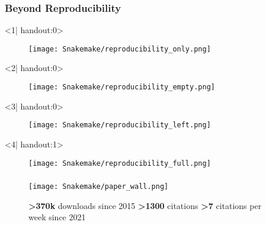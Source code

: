 \begin{frame}
  \frametitle{Beyond Reproducibility}
  \begin{onlyenv}<1| handout:0>
    \begin{figure}
      \centering
      \texttt{[image: Snakemake/reproducibility\_only.png]}
    \end{figure}
  \end{onlyenv}
  \begin{onlyenv}<2| handout:0>
    \begin{figure}
      \centering
      \texttt{[image: Snakemake/reproducibility\_empty.png]}
    \end{figure}
  \end{onlyenv}
  \begin{onlyenv}<3| handout:0>
    \begin{figure}
      \centering
      \texttt{[image: Snakemake/reproducibility\_left.png]}
    \end{figure}
  \end{onlyenv}
    \begin{onlyenv}<4| handout:1>
      \begin{figure}
        \centering
        \texttt{[image: Snakemake/reproducibility\_full.png]}
      \end{figure}
  \end{onlyenv}
  \footnotesize{}
\end{frame}

\begin{frame}
  \frametitle{\Snakemake}
  \begin{figure}
    \centering
    \caption*{\textbf{>370k} downloads since 2015\newline
             \textbf{>1300} citations\newline
             \textbf{>7} citations per week since 2021}
    \texttt{[image: Snakemake/paper\_wall.png]}
  \end{figure}
\end{frame}

